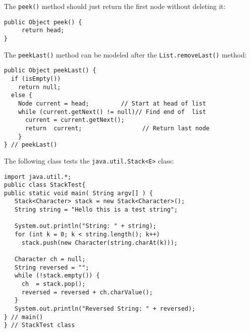 \begin{ANS}
\item  The {\tt peek()} method should just return the
first node without deleting it:

\begin{jjjlisting}
\begin{lstlisting}
public Object peek() {
     return head;
}
\end{lstlisting}
\end{jjjlisting}

\item  The {\tt peekLast()} method can be modeled after the
{\tt List.re\-moveLast()} method:

\begin{jjjlisting}
\begin{lstlisting}
public Object peekLast() {
  if (isEmpty())
    return null;
  else {
    Node current = head;         // Start at head of list
    while (current.getNext() != null)// Find end of  list
      current = current.getNext();
      return  current;                 // Return last node
    }
} // peekLast()
\end{lstlisting}
\end{jjjlisting}

\item  The following class tests the {\tt java.util.Stack<E>} class:

\begin{jjjlisting}
\begin{lstlisting}
import java.util.*;
public class StackTest{
public static void main( String argv[] ) {
   Stack<Character> stack = new Stack<Character>();
   String string = "Hello this is a test string";

   System.out.println("String: " + string);
   for (int k = 0; k < string.length(); k++)
     stack.push(new Character(string.charAt(k)));

   Character ch = null;
   String reversed = "";
   while (!stack.empty()) {
     ch  = stack.pop();
     reversed = reversed + ch.charValue();
   }
   System.out.println("Reversed String: " + reversed);
} // main()
} // StackTest class
\end{lstlisting}
\end{jjjlisting}


\end{ANS}


